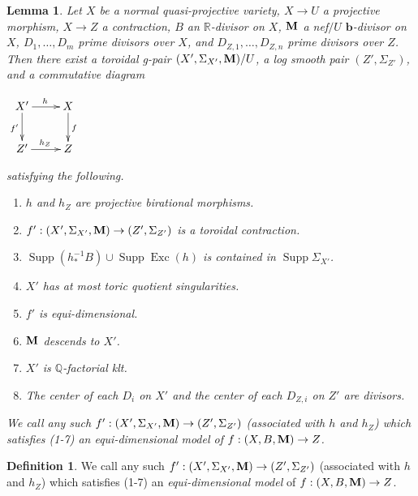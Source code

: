 \documentclass[11pt]{amsart}
\numberwithin{equation}{section}
\newcommand{\bb}{\bm{b}}
\newcommand{\Mm}{{\bf{M}}}
\newcommand{\Qq}{\mathbb{Q}}
\newcommand{\Rr}{\mathbb{R}}
\newcommand{\Exc}{\operatorname{Exc}}
\newcommand{\Supp}{\operatorname{Supp}}
\newtheorem{lem}[thm]{Lemma}
\theoremstyle{definition}
\newtheorem{defn}[thm]{Definition}
\theoremstyle{definition}
\theoremstyle{definition}
\begin{document}
\begin{lem}\label{lem: equi-dimensional model}
Let $X$ be a normal quasi-projective variety, $X\rightarrow U$ a projective morphism, $X\rightarrow Z$ a contraction, $B$ an $\Rr$-divisor on $X$, $\Mm$ a nef$/U$ $\bb$-divisor on $X$, $D_1,\dots,D_m$ prime divisors over $X$, and $D_{Z,1},\dots,D_{Z,n}$ prime divisors over $Z$. Then there exist a toroidal g-pair  $(X',\Sigma_{X'},\Mm)/U$, a log smooth pair $(Z',\Sigma_{Z'})$, and a commutative diagram
 \begin{center}$\xymatrix{
X'\ar@{->}[r]^{h}\ar@{->}[d]_{f'}& X\ar@{->}[d]^{f}\\
Z'\ar@{->}[r]^{h_Z} & Z\\
}$
\end{center}
satisfying the following.
\begin{enumerate}
\item $h$ and $h_Z$ are projective birational morphisms.
\item $f': (X',\Sigma_{X'},\Mm)\rightarrow (Z',\Sigma_{Z'})$ is a toroidal contraction.
\item $\Supp(h^{-1}_*B)\cup\Supp\Exc(h)$ is contained in $\Supp\Sigma_{X'}$.
\item $X'$ has at most toric quotient singularities.
\item $f'$ is equi-dimensional.
\item $\Mm$ descends to $X'$.
\item $X'$ is $\Qq$-factorial klt.
\item The center of each $D_i$ on $X'$ and the center of each $D_{Z,i}$ on $Z'$ are divisors.
\end{enumerate}
We call any such $f': (X',\Sigma_{X'},\Mm)\rightarrow (Z',\Sigma_{Z'})$ (associated with $h$ and $h_Z$) which satisfies (1-7) an \emph{equi-dimensional model} of $f: (X,B,\Mm)\rightarrow Z$. 
\end{lem}

\begin{defn}\label{defn: eequi-dimensional model}
We call any such $f': (X',\Sigma_{X'},\Mm)\rightarrow (Z',\Sigma_{Z'})$ (associated with $h$ and $h_Z$) which satisfies (1-7) an \emph{equi-dimensional model} of $f: (X,B,\Mm)\rightarrow Z$. 
\end{defn}
\end{document}
